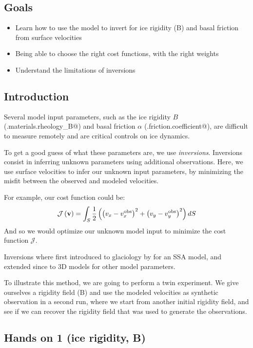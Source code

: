\subsection{Goals} %
\begin{itemize}
	\item Learn how to use the model to invert for ice rigidity (B) and basal friction from surface velocities
	\item Being able to choose the right cost functions, with the right weights
	\item Understand the limitations of inversions
\end{itemize}
\subsection{Introduction}%
Several model input parameters, such as the ice rigidity $B$ (\verb@md.materials.rheology_B@) and basal friction $\alpha$ (\verb@md.friction.coefficient@), are difficult to measure remotely and are critical controls on ice dynamics.

To get a good guess of what these parameters are, we use \emph{inversions}. Inversions consist in inferring unknown parameters using additional observations. Here, we use surface velocities to infer our unknown input parameters, by minimizing the misfit between the observed and modeled velocities.

For example, our cost function could be:
\begin{equation}
	{\mathcal J\left({\bf v}\right)}
	=\int_{S} \dfrac{1}{2}\left(
	\left(v_x-v_x^{\text{obs}}\right)^{2}
	+\left(v_y-v_y^{\text{obs}}\right)^{2}
	\right) dS
\end{equation}
And so we would optimize our unknown model input to minimize the cost function ${\mathcal J}$.

Inversions where first introduced to glaciology by \cite{MacAyeal1993a} for an SSA model, and extended since to 3D models for other model parameters.

To illustrate this method, we are going to perform a twin experiment. We give ourselves a rigidity field (B) and use the modeled velocities as synthetic observation in a second run, where we start from another initial rigidity field, and see if we can recover the rigidity field that was used to generate the observations.
\subsection{Hands on 1 (ice rigidity, B)} %
